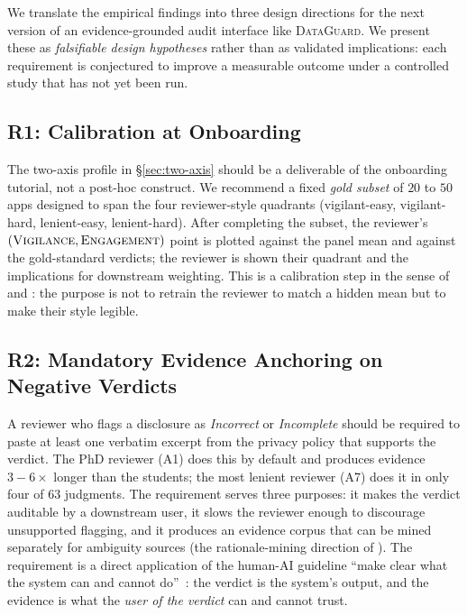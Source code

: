 \documentclass[11pt,a4paper]{article}
\newcommand{\dataguard}{\textsc{DataGuard}}
\newcommand{\Acc}[1]{\textsf{A#1}}
\begin{document}
We translate the empirical findings into three design directions for
the next version of an evidence-grounded audit interface like
\dataguard. We present these as \emph{falsifiable design hypotheses}
rather than as validated implications: each requirement is
conjectured to improve a measurable outcome under a controlled study
that has not yet been run.

\subsection{R1: Calibration at Onboarding}
\label{sec:r1}

The two-axis profile in \S\ref{sec:two-axis} should be a deliverable
of the onboarding tutorial, not a post-hoc construct. We recommend a
fixed \emph{gold subset} of $20$ to $50$ apps designed to span the
four reviewer-style quadrants (vigilant-easy, vigilant-hard,
lenient-easy, lenient-hard). After completing the subset, the
reviewer's $(\textsc{Vigilance},\textsc{Engagement})$ point is
plotted against the panel mean and against the gold-standard
verdicts; the reviewer is shown their quadrant and the implications
for downstream weighting. This is a calibration step in the sense
of \citet{cai2019hello} and \citet{amershi2019guidelines}: the
purpose is not to retrain the reviewer to match a hidden mean but
to make their style legible.

\subsection{R2: Mandatory Evidence Anchoring on Negative Verdicts}
\label{sec:r2}

A reviewer who flags a disclosure as \emph{Incorrect} or
\emph{Incomplete} should be required to paste at least one verbatim
excerpt from the privacy policy that supports the verdict. The PhD
reviewer (\Acc{1}) does this by default and produces evidence
$3{-}6{\times}$ longer than the students; the most lenient reviewer
(\Acc{7}) does it in only four of $63$ judgments. The requirement
serves three purposes: it makes the verdict auditable by a
downstream user, it slows the reviewer enough to discourage
unsupported flagging, and it produces an evidence corpus that can be
mined separately for ambiguity sources (the rationale-mining
direction of \citealp{harkous2018polisis}). The requirement is a
direct application of the human-AI guideline ``make clear what the
system can and cannot do''~\citep{amershi2019guidelines}: the
verdict is the system's output, and the evidence is what the
\emph{user of the verdict} can and cannot trust.
\end{document}
